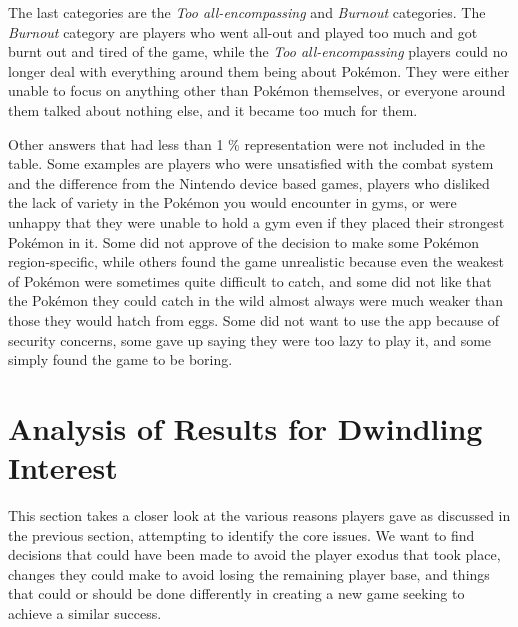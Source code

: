 The last categories are the \emph{Too all-encompassing} and \emph{Burnout} categories. The \emph{Burnout} category are players who went all-out and played too much and got burnt out and tired of the game, while the \emph{Too all-encompassing} players could no longer deal with everything around them being about Pokémon. They were either unable to focus on anything other than Pokémon themselves, or everyone around them talked about nothing else, and it became too much for them.

Other answers that had less than 1 \% representation were not included in the table. Some examples are players who were unsatisfied with the combat system and the difference from the Nintendo device based games, players who disliked the lack of variety in the Pokémon you would encounter in gyms, or were unhappy that they were unable to hold a gym even if they placed their strongest Pokémon in it. Some did not approve of the decision to make some Pokémon region-specific, while others found the game unrealistic because even the weakest of Pokémon were sometimes quite difficult to catch, and some did not like that the Pokémon they could catch in the wild almost always were much weaker than those they would hatch from eggs. Some did not want to use the app because of security concerns, some gave up saying they were too lazy to play it, and some simply found the game to be boring.

\section{Analysis of Results for Dwindling Interest}
\label{sec:success-factors-quitting-analysis}

This section takes a closer look at the various reasons players gave as discussed in the previous section, attempting to identify the core issues. We want to find decisions that could have been made to avoid the player exodus that took place, changes they could make to avoid losing the remaining player base, and things that could or should be done differently in creating a new game seeking to achieve a similar success.

